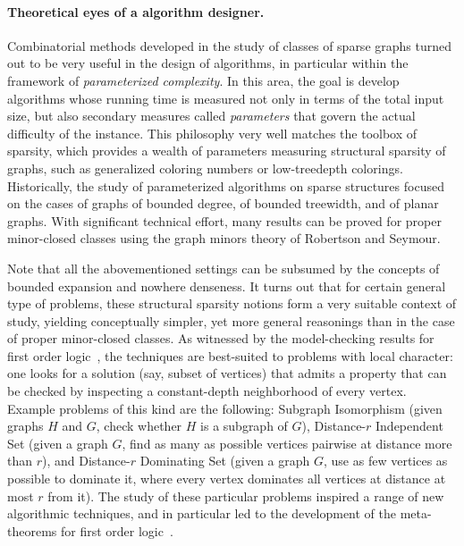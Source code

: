 \paragraph*{Theoretical eyes of a algorithm designer.} 
Combinatorial methods developed in the study of classes of sparse graphs turned out to be very useful in the design of algorithms, in particular within the framework of {\em{parameterized complexity}}.
In this area, the goal is develop algorithms whose running time is measured not only in terms of the total input size, but also secondary measures called {\em{parameters}} that govern the actual 
difficulty of the instance. This philosophy very well matches the toolbox of sparsity, which provides a wealth of parameters measuring structural sparsity of graphs, such as generalized coloring numbers or
low-treedepth colorings. Historically, the study of parameterized algorithms on sparse structures focused on the cases of graphs of bounded degree, of bounded treewidth, and of planar graphs. 
With significant technical effort, many results can be proved for proper minor-closed classes using the graph minors theory of Robertson and Seymour. 

Note that all the abovementioned settings can be subsumed by the concepts of bounded expansion and nowhere denseness.
It turns out that for certain general type of problems, these structural sparsity notions form a very suitable context of study, yielding conceptually simpler, yet more general reasonings than 
in the case of proper minor-closed classes. As witnessed by the model-checking results for first order logic~\cite{DvorakKT13,grohe2017deciding}, the techniques are best-suited to problems with local character:
one looks for a solution (say, subset of vertices) that admits a property that can be checked by inspecting a constant-depth neighborhood of every vertex.
Example problems of this kind are the following: Subgraph Isomorphism (given graphs $H$ and $G$, check whether $H$ is a subgraph of $G$), Distance-$r$ Independent Set (given a graph $G$, find as many as possible
vertices pairwise at distance more than $r$), and Distance-$r$ Dominating Set (given a graph $G$, use as few vertices as possible to dominate it, 
where every vertex dominates all vertices at distance at most $r$ from it).
The study of these particular problems inspired a range of new algorithmic techniques, and in particular led to the development of the meta-theorems for first order logic~\cite{DvorakKT13,grohe2017deciding}.

